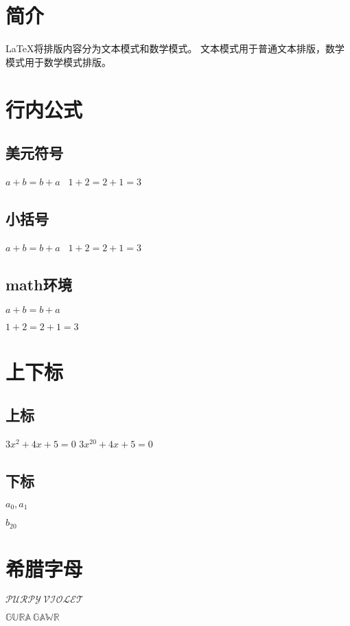 \documentclass{article}
\begin{document}
    \section{简介}
    \LaTeX{}将排版内容分为文本模式和数学模式。
    文本模式用于普通文本排版，数学模式用于数学模式排版。
    \section{行内公式}
    \subsection{美元符号}%
    $a+b = b+a$ \ $1+2 = 2+1 = 3$



    \subsection{小括号}
    \(a+b=b+a\) \ \(1+2 = 2+1 = 3\)


    \subsection{math环境}
    \begin{math}a+b = b+a \end{math}

    \begin{math}1+2 = 2+1 = 3\end{math}
    \section{上下标}
    \subsection{上标}
    $3x^2 + 4x + 5 = 0$
    $3x^{20} + 4x + 5 = 0$ %

    \subsection{下标}
    $a_0, a_1$

    $b_{20}$

    \section{希腊字母}
    $\mathcal{PURPY \ VIOLET}$ 

    $\mathbb{GURA \ GAWR} $
\end{document}
